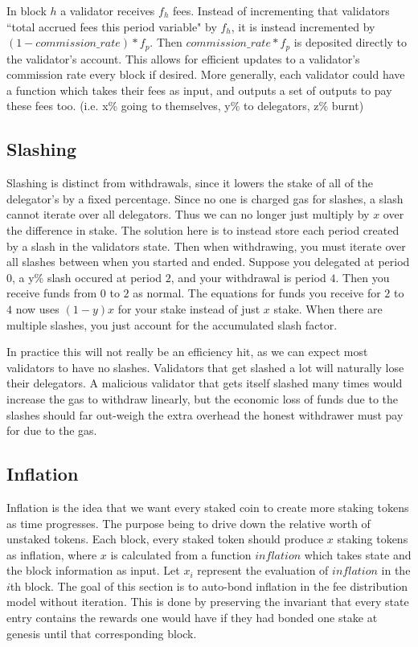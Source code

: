 \documentclass[]{article}
\begin{document}
In block $h$ a validator receives $f_h$ fees.
Instead of incrementing that validators ``total accrued fees this period variable" by $f_h$, it is instead incremented by $(1 - commission\_rate) * f_p$.
Then $commission\_rate * f_p$ is deposited directly to the validator's account.
This allows for efficient updates to a validator's commission rate every block if desired.
More generally, each validator could have a function which takes their fees as input, and outputs a set of outputs to pay these fees too. (i.e. x\% going to themselves, y\% to delegators, z\% burnt)

\subsection{Slashing}
\label{ssec:slashing}
Slashing is distinct from withdrawals, since it lowers the stake of all of the delegator's by a fixed percentage.
Since no one is charged gas for slashes, a slash cannot iterate over all delegators.
Thus we can no longer just multiply by $x$ over the difference in stake. 
The solution here is to instead store each period created by a slash in the validators state.
Then when withdrawing, you must iterate over all slashes between when you started and ended.
Suppose you delegated at period $0$, a y\% slash occured at period $2$, and your withdrawal is period $4$.
Then you receive funds from $0$ to $2$ as normal.
The equations for funds you receive for $2$ to $4$ now uses $(1 - y)x$ for your stake instead of just $x$ stake.
When there are multiple slashes, you just account for the accumulated slash factor.

In practice this will not really be an efficiency hit, as we can expect most validators to have no slashes.
Validators that get slashed a lot will naturally lose their delegators.
A malicious validator that gets itself slashed many times would increase the gas to withdraw linearly, but the economic loss of funds due to the slashes should far out-weigh the extra overhead the honest withdrawer must pay for due to the gas.

\subsection{Inflation}
Inflation is the idea that we want every staked coin to create more staking tokens as time progresses.
The purpose being to drive down the relative worth of unstaked tokens.
Each block, every staked token should produce $x$ staking tokens as inflation, where $x$ is calculated from a function $inflation$ which takes state and the block information as input.
Let $x_i$ represent the evaluation of $inflation$ in the $i$th block.
The goal of this section is to auto-bond inflation in the fee distribution model without iteration.
This is done by preserving the invariant that every state entry contains the rewards one would have if they had bonded one stake at genesis until that corresponding block.
\end{document}
